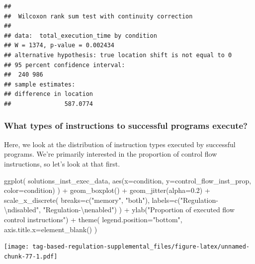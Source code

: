\documentclass[
]{book}
\newenvironment{Shaded}{\begin{snugshade}}{\end{snugshade}}
\newcommand{\AttributeTok}[1]{\textcolor[rgb]{0.77,0.63,0.00}{#1}}
\newcommand{\FloatTok}[1]{\textcolor[rgb]{0.00,0.00,0.81}{#1}}
\newcommand{\FunctionTok}[1]{\textcolor[rgb]{0.00,0.00,0.00}{#1}}
\newcommand{\NormalTok}[1]{#1}
\newcommand{\SpecialCharTok}[1]{\textcolor[rgb]{0.00,0.00,0.00}{#1}}
\newcommand{\StringTok}[1]{\textcolor[rgb]{0.31,0.60,0.02}{#1}}
\begin{document}
\begin{verbatim}
## 
##  Wilcoxon rank sum test with continuity correction
## 
## data:  total_execution_time by condition
## W = 1374, p-value = 0.002434
## alternative hypothesis: true location shift is not equal to 0
## 95 percent confidence interval:
##  240 986
## sample estimates:
## difference in location 
##               587.0774
\end{verbatim}

\hypertarget{what-types-of-instructions-to-successful-programs-execute-1}{%
\subsubsection{What types of instructions to successful programs execute?}\label{what-types-of-instructions-to-successful-programs-execute-1}}

Here, we look at the distribution of instruction types executed by successful programs.
We're primarily interested in the proportion of control flow instructions, so let's look at that first.

\begin{Shaded}
\begin{Highlighting}[]
\FunctionTok{ggplot}\NormalTok{( solutions\_inst\_exec\_data, }\FunctionTok{aes}\NormalTok{(}\AttributeTok{x=}\NormalTok{condition, }\AttributeTok{y=}\NormalTok{control\_flow\_inst\_prop, }\AttributeTok{color=}\NormalTok{condition) ) }\SpecialCharTok{+}
  \FunctionTok{geom\_boxplot}\NormalTok{() }\SpecialCharTok{+}
  \FunctionTok{geom\_jitter}\NormalTok{(}\AttributeTok{alpha=}\FloatTok{0.2}\NormalTok{) }\SpecialCharTok{+}
  \FunctionTok{scale\_x\_discrete}\NormalTok{(}
    \AttributeTok{breaks=}\FunctionTok{c}\NormalTok{(}\StringTok{"memory"}\NormalTok{, }\StringTok{"both"}\NormalTok{),}
    \AttributeTok{labels=}\FunctionTok{c}\NormalTok{(}\StringTok{"Regulation{-}}\SpecialCharTok{\textbackslash{}n}\StringTok{disabled"}\NormalTok{, }\StringTok{"Regulation{-}}\SpecialCharTok{\textbackslash{}n}\StringTok{enabled"}\NormalTok{)}
\NormalTok{  ) }\SpecialCharTok{+}
  \FunctionTok{ylab}\NormalTok{(}\StringTok{"Proportion of executed flow control instructions"}\NormalTok{) }\SpecialCharTok{+}
  \FunctionTok{theme}\NormalTok{(}
    \AttributeTok{legend.position=}\StringTok{"bottom"}\NormalTok{,}
    \AttributeTok{axis.title.x=}\FunctionTok{element\_blank}\NormalTok{()}
\NormalTok{  )}
\end{Highlighting}
\end{Shaded}

\texttt{[image: tag-based-regulation-supplemental\_files/figure-latex/unnamed-chunk-77-1.pdf]}
\end{document}
